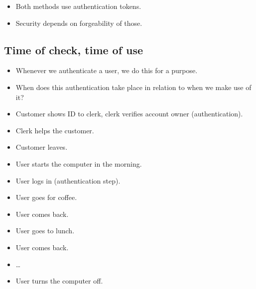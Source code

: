 \begin{frame}
  \begin{remark}
    \begin{itemize}
      \item Both methods use authentication tokens.
      \item Security depends on forgeability of those.
    \end{itemize}
  \end{remark}
\end{frame}

\subsection{Time of check, time of use}

\begin{frame}
  \begin{remark}
    \begin{itemize}
      \item Whenever we authenticate a user, we do this for a purpose.

      \item When does this authentication take place in relation to when we make 
        use of it?
    \end{itemize}
  \end{remark}
\end{frame}

\begin{frame}
  \begin{example}
    \begin{itemize}
      \item Customer shows ID to clerk, clerk verifies account owner 
        (authentication).
      \item Clerk helps the customer.
      \item Customer leaves.
    \end{itemize}
  \end{example}
\end{frame}

\begin{frame}
  \begin{example}
    \begin{itemize}
      \item User starts the computer in the morning.
      \item User logs in (authentication step).
      \item User goes for coffee.
      \item User comes back.
      \item User goes to lunch.
      \item User comes back.
      \item \dots
      \item User turns the computer off.
    \end{itemize}
  \end{example}
\end{frame}


